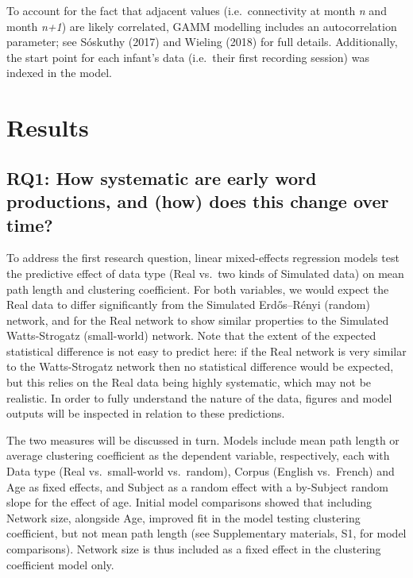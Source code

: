 \documentclass[
  man]{apa6}
\begin{document}
To account for the fact that adjacent values (i.e.~connectivity at month \emph{n} and month \emph{n+1}) are likely correlated, GAMM modelling includes an autocorrelation parameter; see Sóskuthy (2017) and Wieling (2018) for full details. Additionally, the start point for each infant's data (i.e.~their first recording session) was indexed in the model.

\section{Results}\label{results}

\subsection{RQ1: How systematic are early word productions, and (how) does this change over time?}\label{rq1-how-systematic-are-early-word-productions-and-how-does-this-change-over-time}

To address the first research question, linear mixed-effects regression models test the predictive effect of data type (Real vs.~two kinds of Simulated data) on mean path length and clustering coefficient. For both variables, we would expect the Real data to differ significantly from the Simulated Erdős--Rényi (random) network, and for the Real network to show similar properties to the Simulated Watts-Strogatz (small-world) network. Note that the extent of the expected statistical difference is not easy to predict here: if the Real network is very similar to the Watts-Strogatz network then no statistical difference would be expected, but this relies on the Real data being highly systematic, which may not be realistic. In order to fully understand the nature of the data, figures and model outputs will be inspected in relation to these predictions.

The two measures will be discussed in turn. Models include mean path length or average clustering coefficient as the dependent variable, respectively, each with Data type (Real vs.~small-world vs.~random), Corpus (English vs.~French) and Age as fixed effects, and Subject as a random effect with a by-Subject random slope for the effect of age. Initial model comparisons showed that including Network size, alongside Age, improved fit in the model testing clustering coefficient, but not mean path length (see Supplementary materials, S1, for model comparisons). Network size is thus included as a fixed effect in the clustering coefficient model only.
\end{document}
